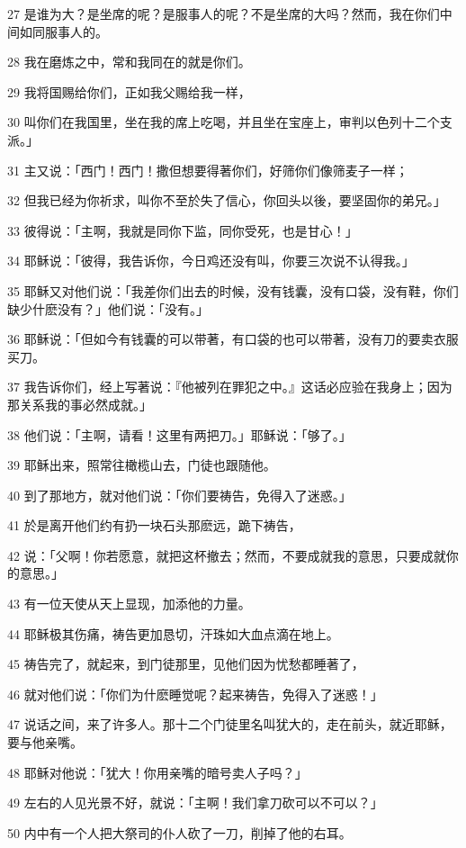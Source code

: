 \par 27 是谁为大？是坐席的呢？是服事人的呢？不是坐席的大吗？然而，我在你们中间如同服事人的。
\par 28 我在磨炼之中，常和我同在的就是你们。
\par 29 我将国赐给你们，正如我父赐给我一样，
\par 30 叫你们在我国里，坐在我的席上吃喝，并且坐在宝座上，审判以色列十二个支派。」
\par 31 主又说：「西门！西门！撒但想要得著你们，好筛你们像筛麦子一样；
\par 32 但我已经为你祈求，叫你不至於失了信心，你回头以後，要坚固你的弟兄。」
\par 33 彼得说：「主啊，我就是同你下监，同你受死，也是甘心！」
\par 34 耶稣说：「彼得，我告诉你，今日鸡还没有叫，你要三次说不认得我。」
\par 35 耶稣又对他们说：「我差你们出去的时候，没有钱囊，没有口袋，没有鞋，你们缺少什麽没有？」他们说：「没有。」
\par 36 耶稣说：「但如今有钱囊的可以带著，有口袋的也可以带著，没有刀的要卖衣服买刀。
\par 37 我告诉你们，经上写著说：『他被列在罪犯之中。』这话必应验在我身上；因为那关系我的事必然成就。」
\par 38 他们说：「主啊，请看！这里有两把刀。」耶稣说：「够了。」
\par 39 耶稣出来，照常往橄榄山去，门徒也跟随他。
\par 40 到了那地方，就对他们说：「你们要祷告，免得入了迷惑。」
\par 41 於是离开他们约有扔一块石头那麽远，跪下祷告，
\par 42 说：「父啊！你若愿意，就把这杯撤去；然而，不要成就我的意思，只要成就你的意思。」
\par 43 有一位天使从天上显现，加添他的力量。
\par 44 耶稣极其伤痛，祷告更加恳切，汗珠如大血点滴在地上。
\par 45 祷告完了，就起来，到门徒那里，见他们因为忧愁都睡著了，
\par 46 就对他们说：「你们为什麽睡觉呢？起来祷告，免得入了迷惑！」
\par 47 说话之间，来了许多人。那十二个门徒里名叫犹大的，走在前头，就近耶稣，要与他亲嘴。
\par 48 耶稣对他说：「犹大！你用亲嘴的暗号卖人子吗？」
\par 49 左右的人见光景不好，就说：「主啊！我们拿刀砍可以不可以？」
\par 50 内中有一个人把大祭司的仆人砍了一刀，削掉了他的右耳。
